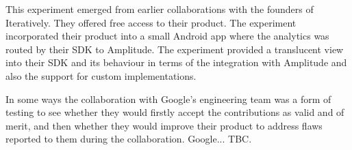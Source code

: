 This experiment emerged from earlier collaborations with the founders of Iteratively. They offered free access to their product. The experiment incorporated their product into a small Android app where the analytics was routed by their SDK to Amplitude. The experiment provided a translucent view into their SDK and its behaviour in terms of the integration with Amplitude and also the support for custom implementations.

In some ways the collaboration with Google's engineering team was a form of testing to see whether they would firstly accept the contributions as valid and of merit, and then whether they would improve their product to address flaws reported to them during the collaboration. Google... TBC.

